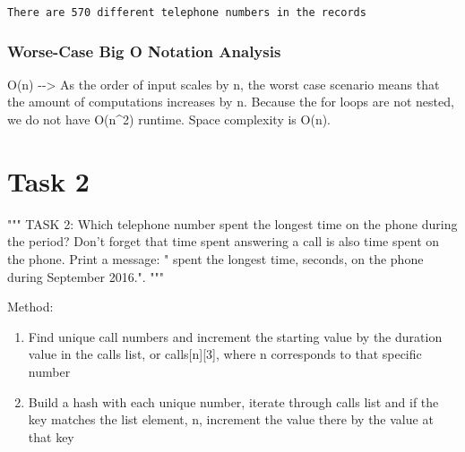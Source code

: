 \documentclass[11pt]{article}
\providecommand{\tightlist}{%
      \setlength{\itemsep}{0pt}\setlength{\parskip}{0pt}}
\begin{document}
    \begin{Verbatim}[commandchars=\\\{\}]
There are 570 different telephone numbers in the records

    \end{Verbatim}

    \subsubsection{Worse-Case Big O Notation
Analysis}\label{worse-case-big-o-notation-analysis}

    O(n) -\/-\textgreater{} As the order of input scales by n, the worst
case scenario means that the amount of computations increases by n.
Because the for loops are not nested, we do not have O(n\^{}2) runtime.
Space complexity is O(n).

    \section{Task 2}\label{task-2}

    """ TASK 2: Which telephone number spent the longest time on the phone
during the period? Don't forget that time spent answering a call is also
time spent on the phone. Print a message: " spent the longest time,
seconds, on the phone during September 2016.". """

    Method:

\begin{enumerate}
\def\labelenumi{\arabic{enumi}.}
\tightlist
\item
  Find unique call numbers and increment the starting value by the
  duration value in the calls list, or calls{[}n{]}{[}3{]}, where n
  corresponds to that specific number
\item
  Build a hash with each unique number, iterate through calls list and
  if the key matches the list element, n, increment the value there by
  the value at that key
\end{enumerate}
\end{document}
